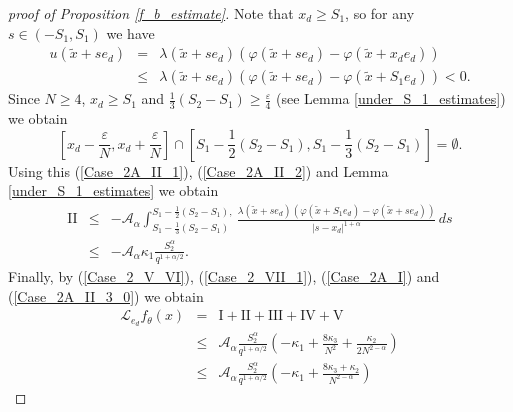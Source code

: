\documentclass[a4paper,12pt,reqno]{amsart}
\theoremstyle{definition}
\theoremstyle{remark}
\newcommand{\eps}{\varepsilon}
\newcommand{\calA}{\mathcal{A}}
\newcommand{\calL}{\mathcal{L}}
\begin{document}
\begin{proof}[proof of Proposition \ref{f_b_estimate}]
Note that $x_d \ge S_1$, so for any $s \in (-S_1,S_1)$ we have
\begin{eqnarray}
\label{Case_2A_II_1}
u(\tilde{x} + s e_d) &=& 
 \lambda(\tilde{x} + s e_d) \left(\varphi(\tilde{x} + s e_d) - \varphi(\tilde{x} + x_d e_d)\right)\\
\label{Case_2A_II_2}
&\le&  \lambda(\tilde{x} + s e_d) \left(\varphi(\tilde{x} + s e_d) - \varphi(\tilde{x} + S_1 e_d)\right) < 0.
\end{eqnarray}
Since $N \ge 4$, $x_d \ge S_1$ and $\frac 13(S_2-S_1)\ge \frac\eps4$ (see Lemma \ref{under_S_1_estimates}) we obtain 
$$
\left[x_d - \frac{\eps}{N}, x_d + \frac{\eps}{N}\right] \cap \left[S_1 - \frac 12(S_2-S_1), S_1 - \frac 13(S_2-S_1)\right] = \emptyset.
$$
Using this (\ref{Case_2A_II_1}), (\ref{Case_2A_II_2}) and Lemma \ref{under_S_1_estimates} we obtain
\begin{eqnarray}
\nonumber
\text{II} &\le&
-\calA_{\alpha}  \int_{S_1 - \frac 13(S_2-S_1)}^{S_1 - \frac 12(S_2-S_1),}
\frac{\lambda(\tilde{x} + s e_d) (\varphi(\tilde{x} + S_1 e_d) - \varphi(\tilde{x} + s e_d))}{|s - x_d|^{1 + \alpha}} \, ds\\
&\le& - \calA_{\alpha} \kappa_1 \frac{S_2^\alpha}{q^{1+\alpha/2}}.
\label{Case_2A_II_3_0}
\end{eqnarray}
Finally, by  (\ref{Case_2_V_VI}), (\ref{Case_2_VII_1}), (\ref{Case_2A_I}) and (\ref{Case_2A_II_3_0}) we obtain
\begin{eqnarray}
\nonumber
\calL_{e_d} f_{\theta}(x)&=&\text{I} +  \text{II} +\text{III}  +\text{IV} + \text{V}\\ 
\nonumber
&\le&
\calA_{\alpha} \frac{S_2^\alpha}{q^{1+\alpha/2}}
\left(- \kappa_1 + \frac{8 \kappa_3}{N^2} + \frac{\kappa_2}{2 N^{2 - \alpha}}\right)\\
\label{Case_2A}
&\le&
\calA_{\alpha} \frac{S_2^\alpha}{q^{1+\alpha/2}}
\left(- \kappa_1 + \frac{8 \kappa_3 + \kappa_2}{N^{2 - \alpha}}\right)
\end{eqnarray}


\end{proof}
\end{document}
